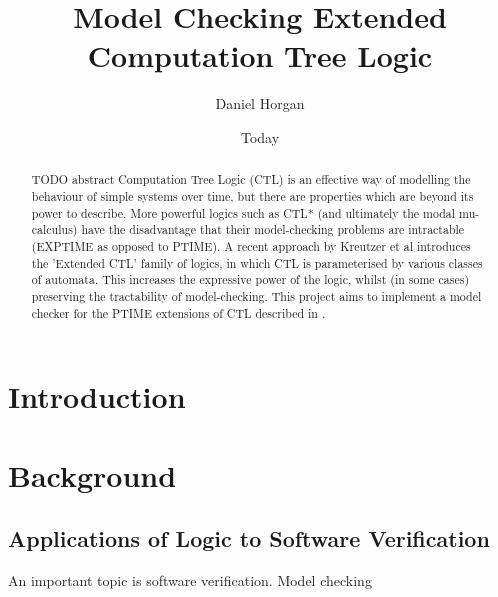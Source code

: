 \documentclass[11pt]{article}
\begin{document}
\title{Model Checking Extended Computation Tree Logic}
\author{Daniel Horgan}
\date{Today}
\maketitle

\begin{comment}
[scratch]
Blablabla said Nobody ~\cite{Nobody06}.
\end{comment}

\begin{abstract}

TODO abstract
Computation Tree Logic (CTL) is an effective way of modelling the behaviour of
simple systems over time, but there are properties which are beyond its power
to describe. More powerful logics such as CTL* (and ultimately the modal
mu-calculus) have the disadvantage that their model-checking problems are
intractable (EXPTIME as opposed to PTIME). A recent approach by Kreutzer et al
\cite{Kreutzer10} introduces the 'Extended CTL' family of logics, in which CTL
is parameterised by various classes of automata. This increases the expressive
power of the logic, whilst (in some cases) preserving the tractability of
model-checking. This project aims to implement a model checker for the PTIME
extensions of CTL described in \cite{Kreutzer10}.

\end{abstract}

\section{Introduction}



\section{Background}

\subsection{Applications of Logic to Software Verification}

An important topic 
is software verification.
Model checking
\end{document}
